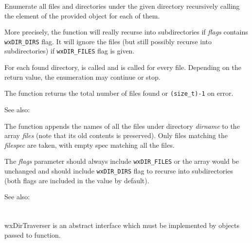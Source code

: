 \label{wxdirtraverse}


Enumerate all files and directories under the given directory recursively
calling the element of the provided  
object for each of them.

More precisely, the function will really recurse into subdirectories if 
{\it flags} contains {\tt wxDIR\_DIRS} flag. It will ignore the files (but
still possibly recurse into subdirectories) if {\tt wxDIR\_FILES} flag is
given.

For each found directory,  is called
and  is called for every file.
Depending on the return value, the enumeration may continue or stop.

The function returns the total number of files found or {\tt (size\_t)-1} on
error.

See also: \label{wxdirgetallfiles}



The function appends the names of all the files under directory {\it dirname} 
to the array {\it files} (note that its old contents is preserved). Only files
matching the {\it filespec} are taken, with empty spec matching all the files.

The {\it flags} parameter should always include {\tt wxDIR\_FILES} or the array
would be unchanged and should include {\tt wxDIR\_DIRS} flag to recurse into
subdirectories (both flags are included in the value by default).

See also: 

\section{}\label{wxdirtraverser}

wxDirTraverser is an abstract interface which must be implemented by objects
passed to  function.

